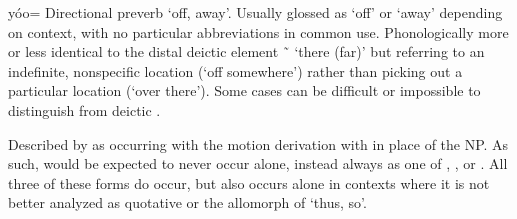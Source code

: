 \begin{morphdesc}[resume*=alphalist]
\item[yóo=]\label{m:yóo=away}
	Directional preverb ‘off, away’.
	Usually glossed as ‘off’ or ‘away’ depending on context, with no particular
		abbreviations in common use.
	Phonologically more or less identical to the distal deictic element
		 \~\  ‘there (far)’
		but referring to an indefinite, nonspecific location
		(‘off somewhere’)
		rather than picking out a particular location
		(‘over there’).
	Some cases can be difficult or impossible to distinguish from deictic .
	
	Described by \textcite[133, 138, 147, 299]{leer:1991} as occurring
		with the motion derivation
		with  in place of the NP.
	As such,  would be expected to never occur alone, instead always
		as one of , , or .
	All three of these forms do occur, but  also occurs alone
		in contexts where it is not better analyzed as quotative 
		or the  allomorph of  ‘thus, so’.


\end{morphdesc}
